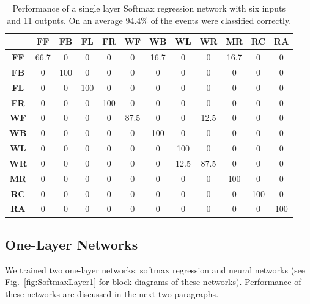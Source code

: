 \documentclass[]{IEEEtran}
\begin{document}
\begin{table}[htb]
\caption{Performance of a single layer Softmax regression network with six
inputs and 11 outputs. On an average 94.4\% of the events were classified
correctly.} \label{tab:softmaxOnelayer}
\resizebox{\columnwidth}{!}
{
\begin{tabular}{|c|c|c|c|c|c|c|c|c|c|c|c|}
\hline 
& \textbf{FF} & \textbf{FB}  & \textbf{FL} & \textbf{FR} &  \textbf{WF} & 
\textbf{WB} & \textbf{WL} & \textbf{WR} & \textbf{MR} & 
\textbf{RC} & \textbf{RA} \\ \hline
\textbf{FF} & 66.7 &  0 &  0 &  0 &  0 &  16.7 &  0 &  0 &  16.7 &  0 &  0 \\ \hline
\textbf{FB} & 0 &  100 &  0 &  0 &  0 &  0 &  0 &  0 &  0 &  0 &  0 \\ \hline
\textbf{FL} & 0 &  0 &  100 &  0 &  0 &  0 &  0 &  0 &  0 &  0 &  0 \\ \hline
\textbf{FR} & 0 &  0 &  0 &  100 &  0 &  0 &  0 &  0 &  0 &  0 &  0 \\ \hline
\textbf{WF} & 0 &  0 &  0 &  0 &  87.5 &  0 &  0 &  12.5 &  0 &  0 &  0 \\ \hline
\textbf{WB} & 0 &  0 &  0 &  0 &  0 &  100 &  0 &  0 &  0 &  0 &  0 \\ \hline
\textbf{WL} & 0 &  0 &  0 &  0 &  0 &  0 &  100 &  0 &  0 &  0 &  0 \\ \hline
\textbf{WR} & 0 &  0 &  0 &  0 &  0 &  0 &  12.5 &  87.5 &  0 &  0 &  0 \\ \hline
\textbf{MR} & 0 &  0 &  0 &  0 &  0 &  0 &  0 &  0 &  100 &  0 &  0 \\ \hline
\textbf{RC} & 0 &  0 &  0 &  0 &  0 &  0 &  0 &  0 &  0 &  100 &  0 \\ \hline
\textbf{RA} & 0 &  0 &  0 &  0 &  0 &  0 &  0 &  0 &  0 &  0 &  100 \\ \hline
\end{tabular}
}
\end{table}


\subsection{One-Layer Networks} \label{sec:SingleLayerNetworks} We  trained two
one-layer networks: softmax regression and neural networks (see
Fig.~\ref{fig:SoftmaxLayer1} for block diagrams of these networks). Performance
of these networks are discussed in the next two paragraphs.
 
\end{document}
